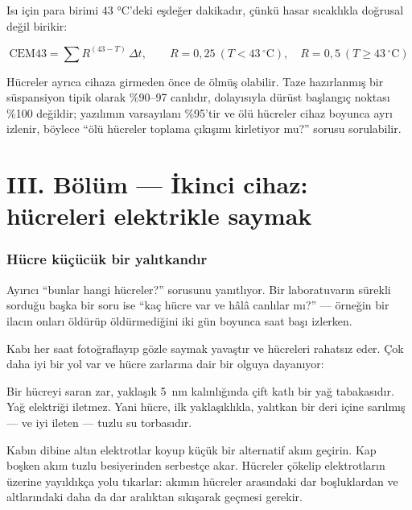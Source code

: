 \documentclass[11pt,a4paper]{article}
\begin{document}
Isı için para birimi 43 °C'deki eşdeğer dakikadır, çünkü hasar sıcaklıkla
doğrusal değil birikir:

\begin{equation}
\mathrm{CEM43} = \sum R^{(43-T)}\,\Delta t,
\qquad R = 0{,}25\ (T<43\,^\circ\text{C}),\quad R = 0{,}5\ (T\ge 43\,^\circ\text{C})
\end{equation}

Hücreler ayrıca cihaza girmeden önce de ölmüş olabilir. Taze hazırlanmış bir
süspansiyon tipik olarak \%90--97 canlıdır, dolayısıyla dürüst başlangıç noktası
\%100 değildir; yazılımın varsayılanı \%95'tir ve ölü hücreler cihaz boyunca ayrı
izlenir, böylece ``ölü hücreler toplama çıkışımı kirletiyor mu?'' sorusu
sorulabilir.

\clearpage
\part*{III. Bölüm --- İkinci cihaz: hücreleri elektrikle saymak}

\section{Hücre küçücük bir yalıtkandır}

Ayırıcı ``bunlar hangi hücreler?'' sorusunu yanıtlıyor. Bir laboratuvarın
sürekli sorduğu başka bir soru ise ``kaç hücre var ve hâlâ canlılar mı?''
--- örneğin bir ilacın onları öldürüp öldürmediğini iki gün boyunca saat başı
izlerken.

Kabı her saat fotoğraflayıp gözle saymak yavaştır ve hücreleri rahatsız eder.
Çok daha iyi bir yol var ve hücre zarlarına dair bir olguya dayanıyor:

\begin{plain}
Bir hücreyi saran zar, yaklaşık \SI{5}{\nano\meter} kalınlığında çift katlı bir
yağ tabakasıdır. Yağ elektriği iletmez. Yani hücre, ilk yaklaşıklıkla, yalıtkan
bir deri içine sarılmış --- ve iyi ileten --- tuzlu su torbasıdır.
\end{plain}

Kabın dibine altın elektrotlar koyup küçük bir alternatif akım geçirin. Kap
boşken akım tuzlu besiyerinden serbestçe akar. Hücreler çökelip elektrotların
üzerine yayıldıkça yolu tıkarlar: akımın hücreler arasındaki dar boşluklardan ve
altlarındaki daha da dar aralıktan sıkışarak geçmesi gerekir.
\end{document}
